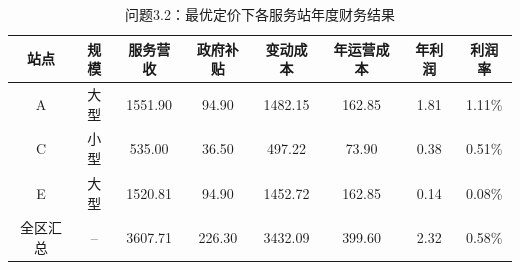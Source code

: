 \begin{table}[h]
\centering
\caption{问题3.2：最优定价下各服务站年度财务结果}
\begin{tabular}{|c|c|c|c|c|c|c|c|}
\hline
站点 & 规模 & 服务营收 & 政府补贴 & 变动成本 & 年运营成本 & 年利润 & 利润率 \\
\hline
A & 大型 & 1551.90 & 94.90 & 1482.15 & 162.85 & 1.81 & 1.11\% \\
C & 小型 & 535.00 & 36.50 & 497.22 & 73.90 & 0.38 & 0.51\% \\
E & 大型 & 1520.81 & 94.90 & 1452.72 & 162.85 & 0.14 & 0.08\% \\
全区汇总 & -- & 3607.71 & 226.30 & 3432.09 & 399.60 & 2.32 & 0.58\% \\
\hline
\end{tabular}
\end{table}